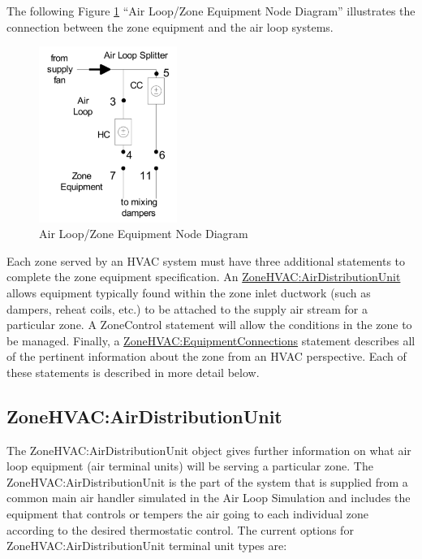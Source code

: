 The following Figure \ref{fig:air-loopzone-equipment-node-diagram} ``Air Loop/Zone Equipment Node Diagram'' illustrates the connection between the zone equipment and the air loop systems.

\begin{figure}[hbtp]
\centering
\includegraphics[width=0.4\textwidth, keepaspectratio=true]{media/image263.png}
\caption{Air Loop/Zone Equipment Node Diagram \protect \label{fig:air-loopzone-equipment-node-diagram}}
\end{figure}

Each zone served by an HVAC system must have three additional statements to complete the zone equipment specification. An \hyperref[zonehvacairdistributionunit]{ZoneHVAC:AirDistributionUnit} allows equipment typically found within the zone inlet ductwork (such as dampers, reheat coils, etc.) to be attached to the supply air stream for a particular zone. A ZoneControl statement will allow the conditions in the zone to be managed. Finally, a \hyperref[zonehvacequipmentconnections]{ZoneHVAC:EquipmentConnections} statement describes all of the pertinent information about the zone from an HVAC perspective. Each of these statements is described in more detail below.

\subsection{ZoneHVAC:AirDistributionUnit}\label{zonehvacairdistributionunit}

The ZoneHVAC:AirDistributionUnit object gives further information on what air loop equipment (air terminal units) will be serving a particular zone. The ZoneHVAC:AirDistributionUnit is the part of the system that is supplied from a common main air handler simulated in the Air Loop Simulation and includes the equipment that controls or tempers the air going to each individual zone according to the desired thermostatic control. The current options for ZoneHVAC:AirDistributionUnit terminal unit types are:

